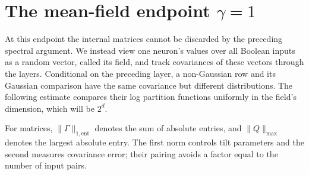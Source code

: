\section{The mean-field endpoint \texorpdfstring{$\gamma=1$}{gamma = 1}}\label{sec:meanfield}
At this endpoint the internal matrices cannot be discarded by the preceding
spectral argument. We instead view one neuron's values over all Boolean
inputs as a random vector, called its field, and track covariances of these
vectors through the layers. Conditional on the preceding layer, a
non-Gaussian row and its Gaussian comparison have the same covariance
but different distributions. The following estimate compares their log
partition functions uniformly in the field's dimension, which will be
$2^d$.

For matrices, $\|\Gamma\|_{1,\mathrm{ent}}$ denotes the sum of absolute
entries, and $\|Q\|_{\max}$ denotes the largest absolute entry. The
first norm controls tilt parameters and the second measures covariance
error; their pairing avoids a factor equal to the number of input pairs.

